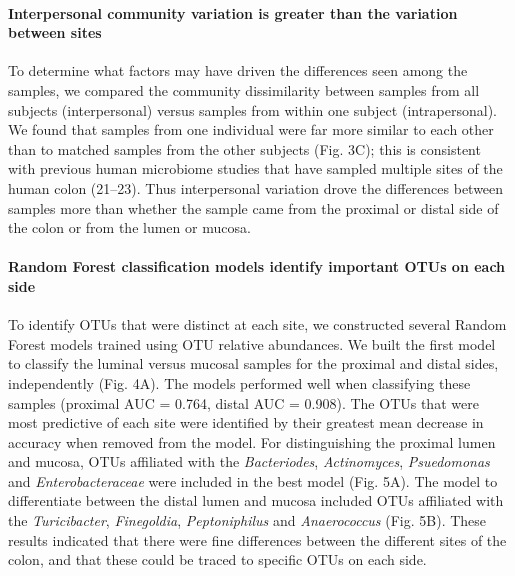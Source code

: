 \documentclass[12pt,]{article}
\let\oldparagraph\paragraph
\renewcommand{\paragraph}[1]{\oldparagraph{#1}\mbox{}}
\begin{document}
\paragraph{Interpersonal community variation is greater than the
variation between
sites}\label{interpersonal-community-variation-is-greater-than-the-variation-between-sites}

To determine what factors may have driven the differences seen among the
samples, we compared the community dissimilarity between samples from
all subjects (interpersonal) versus samples from within one subject
(intrapersonal). We found that samples from one individual were far more
similar to each other than to matched samples from the other subjects
(Fig. 3C); this is consistent with previous human microbiome studies
that have sampled multiple sites of the human colon (21--23). Thus
interpersonal variation drove the differences between samples more than
whether the sample came from the proximal or distal side of the colon or
from the lumen or mucosa.

\paragraph{Random Forest classification models identify important OTUs
on each
side}\label{random-forest-classification-models-identify-important-otus-on-each-side}

To identify OTUs that were distinct at each site, we constructed several
Random Forest models trained using OTU relative abundances. We built the
first model to classify the luminal versus mucosal samples for the
proximal and distal sides, independently (Fig. 4A). The models performed
well when classifying these samples (proximal AUC = 0.764, distal AUC =
0.908). The OTUs that were most predictive of each site were identified
by their greatest mean decrease in accuracy when removed from the model.
For distinguishing the proximal lumen and mucosa, OTUs affiliated with
the \emph{Bacteriodes}, \emph{Actinomyces}, \emph{Psuedomonas} and
\emph{Enterobacteraceae} were included in the best model (Fig. 5A). The
model to differentiate between the distal lumen and mucosa included OTUs
affiliated with the \emph{Turicibacter}, \emph{Finegoldia},
\emph{Peptoniphilus} and \emph{Anaerococcus} (Fig. 5B). These results
indicated that there were fine differences between the different sites
of the colon, and that these could be traced to specific OTUs on each
side.
\end{document}
